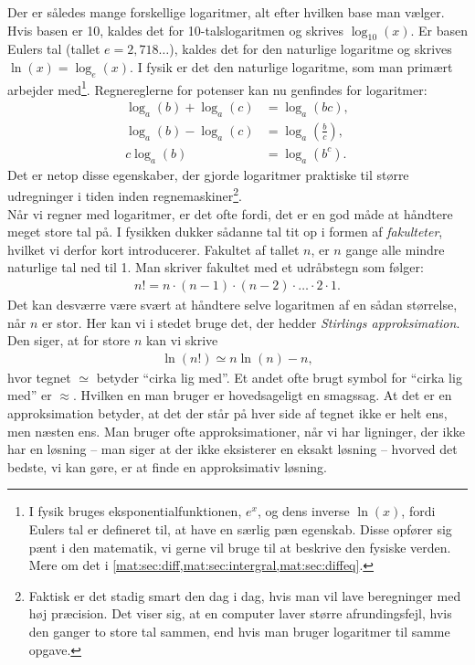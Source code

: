 Der er således mange forskellige logaritmer, alt efter hvilken base man vælger. Hvis basen er 10, kaldes det for 10-talslogaritmen og skrives $\log_{10}(x)$. 
Er basen Eulers tal (tallet $e=2,718 \dots{}$), kaldes det for den naturlige logaritme og skrives $\ln(x) = \log_e(x)$. I fysik er det den naturlige logaritme, som man primært arbejder med\footnote{I fysik bruges eksponentialfunktionen, $e^x$, og dens inverse $\ln(x)$, fordi Eulers tal er defineret til, at have en særlig pæn egenskab. Disse opfører sig pænt i den matematik, vi gerne vil bruge til at beskrive den fysiske verden. Mere om det i \cref{mat:sec:diff,mat:sec:intergral,mat:sec:diffeq}.}. Regnereglerne for potenser kan nu genfindes for logaritmer:
%
\begin{subequations}
\label{mat:eq:log}
\begin{align}
    \log_a(b)+\log_a(c)&=\log_a(bc), \label{mat:log:plus} \\
    \log_a(b)-\log_a(c)&=\log_a\left(\frac{b}{c}\right), \label{mat:log:minus} \\
    c\log_a(b)&=\log_a(b^c). \label{mat:log:gange}
\end{align}
\end{subequations}
%
Det er netop disse egenskaber, der gjorde logaritmer praktiske til større udregninger i tiden inden regnemaskiner\footnote{Faktisk er det stadig smart den dag i dag, hvis man vil lave beregninger med høj præcision. Det viser sig, at en computer laver større afrundingsfejl, hvis den ganger to store tal sammen, end hvis man bruger logaritmer til samme opgave.}. \\

Når vi regner med logaritmer, er det ofte fordi, det er en god måde at håndtere meget store tal på. I fysikken dukker sådanne tal tit op i formen af \emph{fakulteter}, hvilket vi derfor kort introducerer. 
Fakultet af tallet $n$, er $n$ gange alle mindre naturlige tal ned til 1.
Man skriver fakultet med et udråbstegn som følger:
%
\begin{align} \label{mat:eq:fakultet}
    n!=n\cdot(n-1)\cdot(n-2)\cdot \dots{} \cdot 2\cdot 1.
\end{align}
%
Det kan desværre være svært at håndtere selve logaritmen af en sådan størrelse, når $n$ er stor.
Her kan vi i stedet bruge det, der hedder \emph{Stirlings approksimation}.
Den siger, at for store $n$ kan vi skrive
%
\begin{align}
    \ln(n!) \simeq n\ln(n)-n,
\end{align}
%
hvor tegnet $\simeq$ betyder ``cirka lig med''. Et andet ofte brugt symbol for ``cirka lig med'' er $\approx$. Hvilken en man bruger er hovedsageligt en smagssag. At det er en approksimation betyder, at det der står på hver side af tegnet ikke er helt ens, men næsten ens. Man bruger ofte approksimationer, når vi har ligninger, der ikke har en løsning -- man siger at der ikke eksisterer en eksakt løsning --  hvorved det bedste, vi kan gøre, er at finde en approksimativ løsning. %


